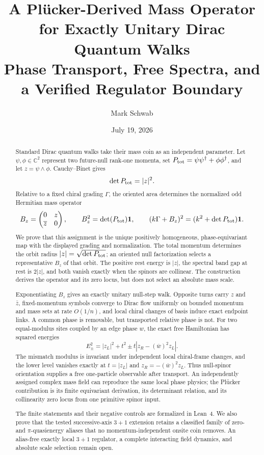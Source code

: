 \documentclass[11pt]{article}
\title{A Pl\"ucker-Derived Mass Operator for Exactly Unitary Dirac Quantum Walks\\
\large Phase Transport, Free Spectra, and a Verified Regulator Boundary}
\author{Mark Schwab}
\date{July 19, 2026}
\newcommand{\C}{\mathbb{C}}
\newcommand{\id}{\mathbf{1}}
\begin{document}
\maketitle

\begin{abstract}
Standard Dirac quantum walks take their mass coin as an independent parameter.
Let $\psi,\phi\in\C^2$ represent two future-null rank-one momenta, set
$P_{\rm tot}=\psi\psi^\dagger+\phi\phi^\dagger$, and let
$z=\psi\wedge\phi$.  Cauchy--Binet gives
\[
  \det P_{\rm tot}=|z|^2.
\]
Relative to a fixed chiral grading $\Gamma$, the oriented area determines the
normalized odd Hermitian mass operator
\[
  B_z=\begin{pmatrix}0&z\\ \overline z&0\end{pmatrix},\qquad
  B_z^2=\det(P_{\rm tot})\id,\qquad
  (k\Gamma+B_z)^2=(k^2+\det P_{\rm tot})\id.
\]
We prove that this assignment is the unique positively homogeneous,
phase-equivariant map with the displayed grading and normalization.  The total
momentum determines the orbit radius $|z|=\sqrt{\det P_{\rm tot}}$; an oriented
null factorization selects a representative $B_z$ of that orbit.  The positive
rest energy is $|z|$, the spectral band gap at rest is $2|z|$, and both vanish
exactly when the spinors are collinear.  The construction derives the operator
and its zero locus, but does not select an absolute mass scale.

Exponentiating $B_z$ gives an exactly unitary null-step walk.  Opposite turns
carry $z$ and $\bar z$, fixed-momentum symbols converge to Dirac flow uniformly
on bounded momentum and mass sets at rate $O(1/n)$, and local chiral changes of
basis induce exact endpoint links.  A common phase is removable, but transported
relative phase is not.  For two equal-modulus sites coupled by an edge phase
$w$, the exact free Hamiltonian has squared energies
\[
  E_\pm^2=|z_L|^2+t^2
  \pm t\left|z_R-(\overline w)^2z_L\right|.
\]
The mismatch modulus is invariant under independent local chiral-frame changes,
and the lower level vanishes exactly at
$t=|z_L|$ and $z_R=-(\overline w)^2z_L$.  Thus null-spinor orientation supplies
a free one-particle observable after transport.  An independently assigned
complex mass field can reproduce the same local phase physics; the Pl\"ucker
contribution is its finite equivariant derivation, its determinant relation,
and its collinearity zero locus from one primitive spinor input.

The finite statements and their negative controls are formalized in Lean~4.
We also prove that the tested successive-axis $3+1$ extension retains a
classified family of zero- and $\pi$-quasienergy aliases that no
momentum-independent onsite coin removes.  An alias-free exactly local $3+1$
regulator, a complete interacting field dynamics, and absolute scale selection
remain open.
\end{abstract}
\end{document}
